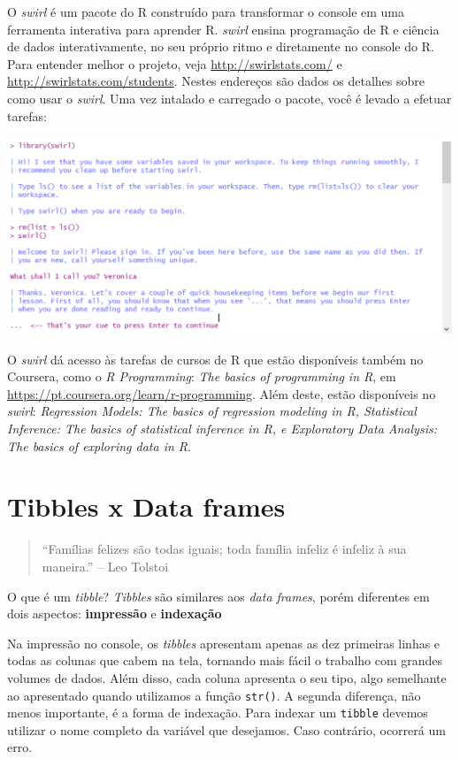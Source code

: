 \documentclass[]{book}
\begin{document}
O \emph{swirl} é um pacote do R construído para transformar o console em uma ferramenta interativa para aprender R. \emph{swirl} ensina programação de R e ciência de dados interativamente, no seu próprio ritmo e diretamente no console do R. Para entender melhor o projeto, veja \url{http://swirlstats.com/} e \url{http://swirlstats.com/students}. Nestes endereços são dados os detalhes sobre como usar o \emph{swirl}. Uma vez intalado e carregado o pacote, você é levado a efetuar tarefas:

\begin{center}\includegraphics[width=0.9\linewidth]{imagens/swirl} \end{center}

O \emph{swirl} dá acesso às tarefas de cursos de R que estão disponíveis também no Coursera, como o \emph{R Programming}: \emph{The basics of programming in R}, em \url{https://pt.coursera.org/learn/r-programming}. Além deste, estão
disponíveis no \emph{swirl}: \emph{Regression Models: The basics of regression modeling in R, Statistical Inference: The basics of statistical inference in R, e Exploratory Data Analysis: The basics of exploring data in R}.

\hypertarget{literature}{%
\chapter{Tibbles x Data frames}\label{literature}}

\begin{quote}
``Famílias felizes são todas iguais; toda família infeliz é infeliz à sua maneira.'' -- Leo Tolstoi
\end{quote}

O que é um \emph{tibble}? \emph{Tibbles} são similares aos \emph{data frames}, porém diferentes em dois aspectos: \textbf{impressão} e \textbf{indexação}

Na impressão no console, os \emph{tibbles} apresentam apenas as dez primeiras linhas e todas as colunas que cabem na tela, tornando mais fácil o trabalho com grandes volumes de dados. Além disso, cada coluna apresenta o seu tipo, algo semelhante ao apresentado quando utilizamos a função \texttt{str()}. A segunda diferença, não menos importante, é a forma de indexação. Para indexar um \texttt{tibble} devemos utilizar o nome completo da variável que desejamos. Caso contrário, ocorrerá um erro.
\end{document}
